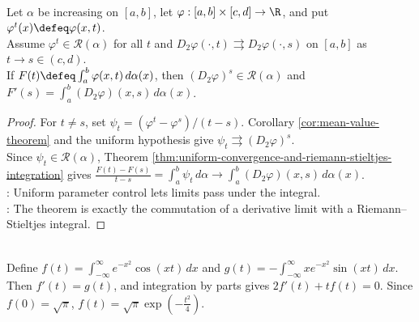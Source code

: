 \begin{theorem} \label{thm:differentiation-under-riemann-stieltjes-integral} \\
Let $\alpha$ be increasing on $[a,b]$, let $\varphi:[a,b]\times[c,d]\to\R$, and put $\varphi^t(x)\defeq\varphi(x,t)$.\\
Assume $\varphi^t\in\mathcal{R}(\alpha)$ for all $t$ and $D_2\varphi(\cdot,t)\rightrightarrows D_2\varphi(\cdot,s)$ on $[a,b]$ as $t\to s\in(c,d)$.\\
If $F(t)\defeq\int_a^b \varphi(x,t)\,d\alpha(x)$, then $(D_2\varphi)^s\in\mathcal{R}(\alpha)$ and $F'(s)=\int_a^b (D_2\varphi)(x,s)\,d\alpha(x)$.
\begin{proof}
For $t\neq s$, set $\psi_t=(\varphi^t-\varphi^s)/(t-s)$. Corollary \ref{cor:mean-value-theorem} and the uniform hypothesis give $\psi_t\rightrightarrows(D_2\varphi)^s$.\\
Since $\psi_t\in\mathcal{R}(\alpha)$, Theorem \ref{thm:uniform-convergence-and-riemann-stieltjes-integration} gives $\frac{F(t)-F(s)}{t-s}=\int_a^b\psi_t\,d\alpha \longrightarrow \int_a^b(D_2\varphi)(x,s)\,d\alpha(x)$.\\
: Uniform parameter control lets limits pass under the integral.\\
: The theorem is exactly the commutation of a derivative limit with a Riemann--Stieltjes integral.
\end{proof}
\end{theorem}

\begin{example} \label{ex:gaussian-fourier-integral-differentiation} \\
Define $f(t)=\int_{-\infty}^{\infty}e^{-x^2}\cos(xt)\,dx$ and $g(t)=-\int_{-\infty}^{\infty}xe^{-x^2}\sin(xt)\,dx$.\\
Then $f'(t)=g(t)$, and integration by parts gives $2f'(t)+tf(t)=0$. Since $f(0)=\sqrt{\pi}$, $f(t)=\sqrt{\pi}\exp\!\left(-\frac{t^2}{4}\right)$.
\end{example}


